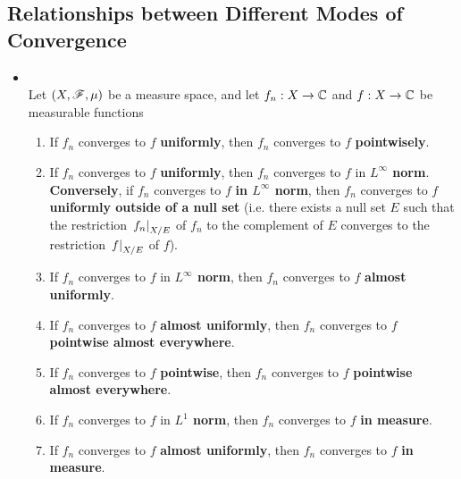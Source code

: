 \documentclass[11pt]{article}
\begin{document}
\subsection{Relationships between Different Modes of Convergence}
\begin{itemize}
\item \begin{proposition} \citep{tao2011introduction}\\
 Let $(X, {\mathscr F}, \mu)$ be a measure space, and let $f_n : X \rightarrow {\mathbb C}$ and $f : X \rightarrow {\mathbb C}$ be measurable functions
\begin{enumerate}
\item If $f_n$ converges to $f$ \textbf{uniformly}, then $f_n$ converges to $f$ \textbf{pointwisely}.
\item If $f_n$ converges to $f$ \textbf{uniformly}, then $f_n$ converges to $f$ in \textbf{$L^\infty$ norm}. \textbf{Conversely}, if $f_n$ converges to $f$ \textbf{in $L^\infty$ norm}, then $f_n$ converges to $f$ \textbf{uniformly outside of a null set} (i.e. there exists a null set $E$ such that the restriction $\left.{f_n}\right\vert_{X/E}$ of $f_n$ to the complement of $E$ converges to the restriction $\left.{f}\right\vert_{X/E}$ of $f$).
\item If $f_n$ converges to $f$ in \textbf{$L^\infty$ norm}, then $f_n$ converges to $f$ \textbf{almost uniformly}.
\item If $f_n$ converges to $f$ \textbf{almost uniformly}, then $f_n$ converges to $f$ \textbf{pointwise almost everywhere}.
\item If $f_n$ converges to $f$ \textbf{pointwise}, then $f_n$ converges to $f$ \textbf{pointwise almost everywhere}.
\item If $f_n$ converges to $f$ in \textbf{$L^1$ norm}, then $f_n$ converges to $f$ \textbf{in measure}.
\item If $f_n$ converges to $f$ \textbf{almost uniformly}, then $f_n$ converges to $f$ \textbf{in measure}.
\end{enumerate}
\end{proposition}


\end{itemize}
\end{document}
